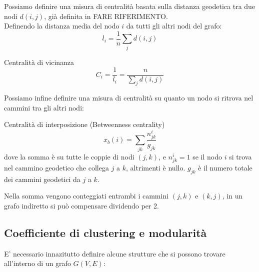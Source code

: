 Possiamo definire una misura di centralità basata sulla distanza geodetica tra due nodi $d(i,j)$, già definita in FARE RIFERIMENTO.\\
Definendo la distanza media del nodo $i$ da tutti gli altri nodi del grafo:
\begin{equation}
  l_i=\frac{1}{n}\sum_{j}^{}d(i,j)
\end{equation}
\begin{boxb}{Centralità di vicinanza}
  \begin{equation}
      C_i=\frac{1}{l_i}=\frac{n}{\sum_{j}^{}d(i,j)}
  \end{equation}
\end{boxb}
Possiamo infine definire una misura di centralità su quanto un nodo si ritrova nel cammini tra gli altri nodi:
\begin{boxb}{Centralità di interposizione (Betweenness centrality)}
\begin{equation}
  x_b(i)=\sum_{jk}^{}\frac{n^i_{jk}}{g_{jk}}
\end{equation}
dove la somma è su tutte le coppie di nodi $(j,k)$, e $n^i_{jk}=1$ se il nodo $i$ si trova nel cammino geodetico che collega $j$ a $k$, altrimenti è nullo. $g_{jk}$ è il numero totale dei cammini geodetici da $j$ a $k$.
\end{boxb}
Nella somma vengono conteggiati entrambi i cammini $(j,k)$ e $(k,j)$, in un grafo indiretto si può compensare dividendo per 2.

\subsection{Coefficiente di clustering e modularità}
E' necessario innazitutto definire alcune strutture che si possono trovare all'interno di un grafo $G(V,E)$:

